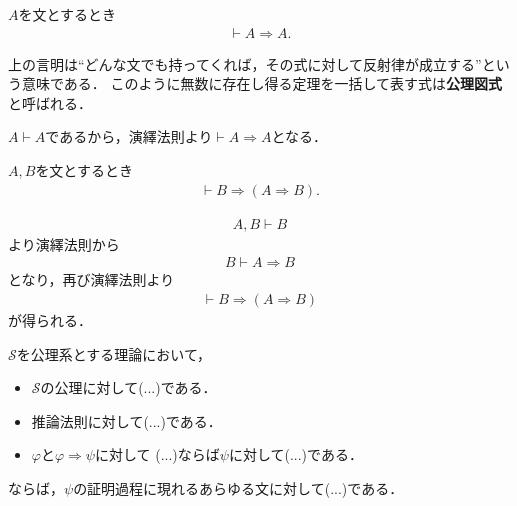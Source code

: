 	\begin{screen}
		\begin{logicalthm}[含意の反射律]\label{logicalthm:reflective_law_of_implication}
			$A$を文とするとき
			\begin{align}
				\vdash A \Longrightarrow A.
			\end{align}
		\end{logicalthm}
	\end{screen}
	
	上の言明は``どんな文でも持ってくれば，その式に対して反射律が成立する''という意味である．
	このように無数に存在し得る定理を一括して表す式は{\bf 公理図式}と呼ばれる．
	
	\begin{prf}
		$A \vdash A$であるから，演繹法則より$\vdash A \Longrightarrow A$となる．
		\QED
	\end{prf}
	
	\begin{screen}
		\begin{logicalthm}[正しい式は仮定を選ばない]\label{logicalthm:rule_of_inference_2}
			$A,B$を文とするとき
			\begin{align}
				\vdash B \Longrightarrow (A \Longrightarrow B).
			\end{align}
		\end{logicalthm}
	\end{screen}
	
	\begin{prf}
		\begin{align}
			A,B \vdash B
		\end{align}
		より演繹法則から
		\begin{align}
			B \vdash A \Longrightarrow B
		\end{align}
		となり，再び演繹法則より
		\begin{align}
			\vdash B \Longrightarrow (A \Longrightarrow B)
		\end{align}
		が得られる．
		\QED
	\end{prf}
	
	\begin{screen}
		\begin{metaaxm}[証明に対する構造的帰納法]
			$\mathscr{S}$を公理系とする理論において，
			\begin{itemize}
				\item $\mathscr{S}$の公理に対して(...)である．
				\item 推論法則に対して(...)である．
				\item $\varphi$と$\varphi \Longrightarrow \psi$に対して
					(...)ならば$\psi$に対して(...)である．
			\end{itemize}
			ならば，$\psi$の証明過程に現れるあらゆる文に対して(...)である．
		\end{metaaxm}
	\end{screen}
	
